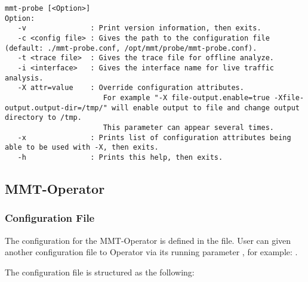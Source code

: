 \begin{lstlisting}[style=BASH]
mmt-probe [<Option>]
Option:
   -v               : Print version information, then exits.
   -c <config file> : Gives the path to the configuration file (default: ./mmt-probe.conf, /opt/mmt/probe/mmt-probe.conf).
   -t <trace file>  : Gives the trace file for offline analyze.
   -i <interface>   : Gives the interface name for live traffic analysis.
   -X attr=value    : Override configuration attributes.
                       For example "-X file-output.enable=true -Xfile-output.output-dir=/tmp/" will enable output to file and change output directory to /tmp.
                       This parameter can appear several times.
   -x               : Prints list of configuration attributes being able to be used with -X, then exits.
   -h               : Prints this help, then exits.
\end{lstlisting}

\subsection{MMT-Operator}

\subsubsection{Configuration File}

The configuration for the MMT-Operator is defined in the  file. 
User can given another configuration file to Operator via its running parameter ,
for example: .

The configuration file is structured as the following:


